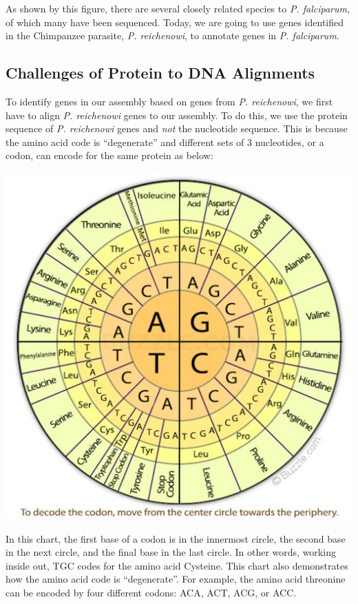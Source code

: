 \documentclass[11pt]{article}
\begin{document}
As shown by this figure, there are several closely related species to
\textit{P. falciparum}, of which many have been sequenced. Today, we are
going to use genes identified in the Chimpanzee parasite, \textit{P.
reichenowi}, to annotate genes in \textit{P. falciparum}.

    \hypertarget{challenges-of-protein-to-dna-alignments}{%
\subsection{Challenges of Protein to DNA
Alignments}\label{challenges-of-protein-to-dna-alignments}}

To identify genes in our assembly based on genes from \textit{P.
reichenowi}, we first have to align \textit{P. reichenowi} genes to our
assembly. To do this, we use the protein sequence of \textit{P.
reichenowi} genes and \textit{not} the nucleotide sequence. This is
because the amino acid code is ``degenerate'' and different sets of 3
nucleotides, or a codon, can encode for the same protein as below:

\includegraphics{images/comparative_2.jpg}

In this chart, the first base of a codon is in the innermost circle, the
second base in the next circle, and the final base in the last circle.
In other words, working inside out, TGC codes for the amino acid
Cysteine. This chart also demonstrates how the amino acid code is
``degenerate''. For example, the amino acid threonine can be encoded by
four different codons: ACA, ACT, ACG, or ACC.
\end{document}
